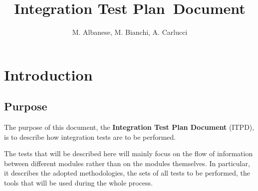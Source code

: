 \documentclass[a4paper, 12pt]{article}
\newcounter{tc}
\begin{document}
\newcommand{\code}[1]{
    \texttt{#1}
}

\newcommand{\testx}[7]{
	\stepcounter{tc}
	\subsubsection{Test \thetc: #1} %

	\begin{tabular}{l p{0.7\textwidth}}
    \hline
    \textbf{Test Case Identifier} & \thetc\\
    \hline
    \textbf{Test Item(s)} & \code{#2} $\rightarrow$ \code{#3}\\
    \hline
    \textbf{Input Specification} & #4\\
    \hline
    \textbf{Output Specification} & #5\\
    \hline
    \textbf{Environmental Needs} & #6\\
    \hline
    \textbf{Test Description} & #7\\
    \hline
	\end{tabular}
}

\title{Integration Test Plan Document}

\author{M. Albanese, M. Bianchi, A. Carlucci}

\maketitle
\newpage{}
\tableofcontents{}

\newpage{}

\section{Introduction}

\subsection{Purpose}
\label{sub:purpose}
The purpose of this document, the \textbf{Integration Test Plan Document} (ITPD), is to describe how integration tests are to be performed.

The tests that will be described here will mainly focus on the flow of information between different modules rather than on the modules themselves.
In particular, it describes the adopted methodologies, the sets of all tests to be performed, the tools that will be used during the whole process.
\end{document}
